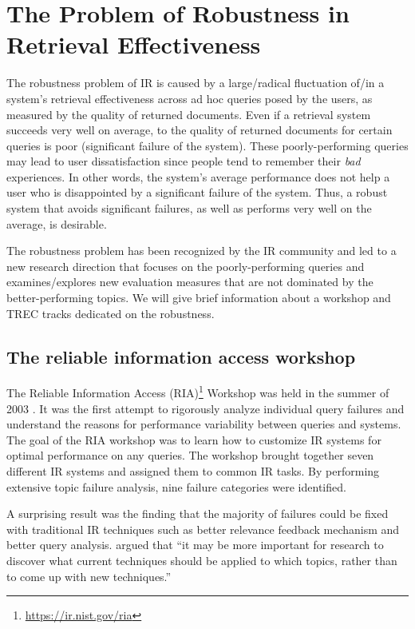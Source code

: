 \section{The Problem of Robustness in Retrieval Effectiveness}
The robustness problem of IR is caused by a large/radical fluctuation of/in a system's retrieval effectiveness across ad hoc queries posed by the users, as measured by the quality of returned documents.
Even if a retrieval system succeeds very well on average, to the quality of returned documents for certain queries is poor (significant failure of the system).
These poorly-performing queries may lead to user dissatisfaction since people tend to remember their \emph{bad} experiences.
In other words, the system's average performance does not help a user who is disappointed by a significant failure of the system.
Thus, a robust system that avoids significant failures, as well as performs very well on the average, is desirable.

The robustness problem has been recognized by the IR community \citep[Chapter~1]{carmel2010estimating} and led to a new research direction
that focuses on the poorly-performing queries and examines/explores new evaluation measures that are not dominated by the better-performing topics.
We will give brief information about a workshop and TREC tracks dedicated on the robustness.

\subsection{The reliable information access workshop}
The Reliable Information Access (RIA)\footnote{\url{https://ir.nist.gov/ria}} Workshop was held in the summer of 2003 \citep{ria2}.
It was the first attempt to rigorously analyze individual query failures and understand the reasons for performance variability between queries and systems.
The goal of the RIA workshop was to learn how to customize IR systems for optimal performance on any queries.
The workshop brought together seven different IR systems and assigned them to common IR tasks. 
By performing extensive topic failure analysis, nine failure categories were identified.

A surprising result was the finding that the majority of failures could be fixed with traditional IR techniques such as better relevance feedback mechanism and better query analysis. 
\citet{ria} argued that ``it may be more important for research to discover what current techniques should be applied to which topics, rather than to come up with new techniques.''

